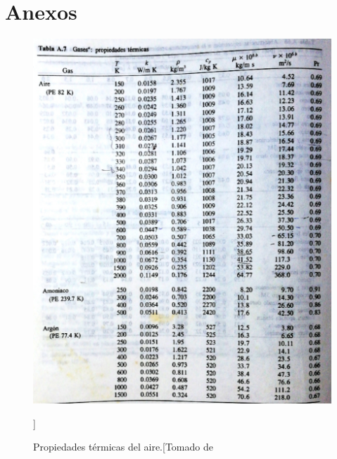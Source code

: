 \documentclass[12pt,letterpaper]{article}     %
\begin{document}


\newpage
\section{Anexos}

\begin{figure}[H]
\centering
\includegraphics[width=1.2\textwidth]{Imagines/Propiedtermicasgases.png}
\caption{Propiedades térmicas del aire.[Tomado de \cite[p\ 868]{Mills}}]
\label{fig:propiedadesgases}
\end{figure}
\end{document}
